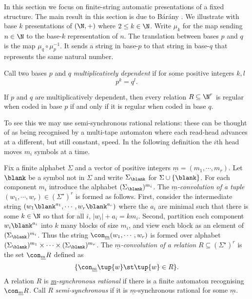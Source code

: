 In this section we focus on finite-string automatic presentations of a fixed structure. The main result in this section is due to B{\'a}r{\'a}ny \cite{Bara06}. We illustrate with base $k$ presentations of
$(\N,+)$ where $2 \leq k \in \N$. Write $\mu_k$ for the map sending $n \in \N$ to the base-$k$ representation of $n$.
The translation between bases $p$ and $q$ is the map $\mu_q \circ \mu_p^{-1}$. It sends a string in base-$p$ to that
string in base-$q$ that represents the same natural number.

Call two bases $p$ and $q$ {\em multiplicatively dependent} if for some positive integers
$k,l$
\[
 p^k = q^l.
\]



\begin{proposition} \label{AS:prop:multdep}
If $p$ and $q$ are multiplicatively dependent, then every relation $R \subseteq \N^r$
is regular when coded in base $p$ if and only if it is regular when coded in base $q$.
\end{proposition}

To see this we may use semi-synchronous rational relations: these can be thought of as being
recognised by a multi-tape automaton where each read-head advances at a
different, but still constant, speed. In the following definition the $i$th head moves $m_i$ symbols at a time.

\begin{definition}
Fix a finite alphabet $\Sigma$ and a vector of positive integers $\underline{m} = (m_1,\cdots,m_r)$.  
Let $\blank$ be a symbol not in $\Sigma$ and write $\Sigma_{\blank}$ for $\Sigma \cup \{\blank\}$.
For each component $m_i$ introduce the alphabet 
$(\Sigma_{\blank})^{m_i}$.  The {\em $\underline{m}$-convolution of a tuple} 
$(w_1,\cdots,w_r) \in (\Sigma^{\star})^r$ is formed as follows. First, consider the intermediate
string $(w_1\blank^{a_1}, \cdots, w_r\blank^{a_r})$ where the $a_i$ are minimal
such that there is some $k \in \N$ so that for all $i$, $|w_i|+a_i = km_i$. Second,
partition each component $w_i\blank^{a_i}$ into $k$ many blocks of size $m_i$,
and view each block as an element of $(\Sigma_{\blank})^{m_i}$. Thus the string
$\con_{\underline{m}} (w_1,\cdots,w_r)$ is formed over alphabet
$(\Sigma_{\blank})^{m_1} \times \cdots \times (\Sigma_{\blank})^{m_r}$.
The {\em $\underline{m}$-convolution of a relation} $R \subseteq (\Sigma^{\star})^r$ is the
set $\con_{\underline{m}} R$ defined as 
\[
\{\con_{\underline{m}} \tup{w} \st \tup{w} \in R\}.
\]
A relation $R$ is {\em \underline{m}-synchronous rational} if there is a finite automaton
recognising $\con_{\underline{m}} R$.
Call $R$ {\em semi-synchronous} if it is $\underline{m}$-synchronous rational for some $\underline{m}$.
\end{definition}

